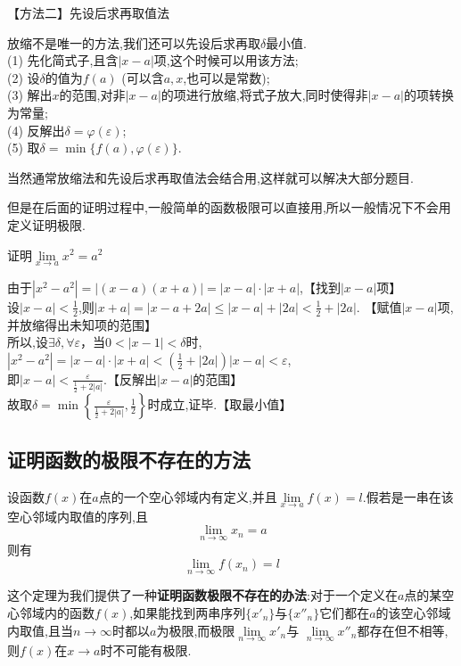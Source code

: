 \noindent 【方法二】先设后求再取值法\vspace{0.8em}
\par 放缩不是唯一的方法,我们还可以先设后求再取$\delta $最小值.\\[0.3em]
\noindent (1) 先化简式子,且含$|x-a|$项,这个时候可以用该方法;\\[0.5em]
\noindent (2) 设$\delta $的值为$f(a)$ (可以含$a,x$,也可以是常数);\\[0.5em]
\noindent (3) 解出$x$的范围,对非$|x - a|$的项进行放缩,将式子放大,同时使得非$|x - a|$的项转换为常量;\\[0.5em]
\noindent (4) 反解出$\delta = \varphi (\varepsilon)$;\\[0.5em]
\noindent (5) 取$\delta = \min \lbrace f(a),\varphi(\varepsilon)\rbrace$.\vspace{0.5em}
\par 当然通常放缩法和先设后求再取值法会结合用,这样就可以解决大部分题目.
\par 但是在后面的证明过程中,一般简单的函数极限可以直接用,所以一般情况下不会用定义证明极限.

\examples 证明$\lim\limits_{x \to a}x^2=a^2$

\proof 由于$|x^2-a^2|=|(x-a)(x+a)|=|x-a|\cdot |x+a| $,\hspace{16em}【找到$|x-a|$项】\\[0.5em]
设$\displaystyle |x-a|<\frac{1}{2}$,则$\displaystyle |x+a|=|x-a+2a|\le |x-a|+|2a|<\frac{1}{2}+|2a|.$ \hspace*{2em}【赋值$|x-a|$项,并放缩得出未知项的范围】\\[0.5em]
所以,设$\exists \delta,\forall \varepsilon$，当$0<|x-1|<\delta $时,$\displaystyle |x^2-a^2|=|x-a|\cdot |x+a|<\left( \frac{1}{2}+|2a|\right)|x-a|<\varepsilon $,\\[0.5em]
即$\displaystyle|x-a|<\frac{\varepsilon}{\frac{1}{2}+2|a|}$.\hspace{29em}【反解出$|x-a|$的范围】\\[0.5em]
故取$\displaystyle \delta = \min \left\lbrace  \frac{\varepsilon}{\frac{1}{2}+2|a|},\frac{1}{2} \right\rbrace $时成立,证毕.\hspace{26em}【取最小值】

\subsection{证明函数的极限不存在的方法}
\ttheorem[序列极限]
设函数$f (x)$在$a$点的一个空心邻域内有定义,并且$\lim\limits_{x \to a}f(x)=l$.假若是一串在该空心邻域内取值的序列,且
\begin{equation*}
\lim\limits_{n \to \infty}x_n=a
\end{equation*}
则有
\begin{equation}
\lim\limits_{n \to \infty}f(x_n)=l
\end{equation}
\par 这个定理为我们提供了一种\textbf{证明函数极限不存在的办法}:对于一个定义在$a$点的某空心邻域内的函数$f(x)$,如果能找到两串序列$\lbrace x'_n \rbrace $与$\lbrace x''_n\rbrace$它们都在$a$的该空心邻域内取值,且当$n\to \infty $时都以$a$为极限,而极限$\lim\limits_{n \to \infty }x'_n$与 $\lim\limits_{n \to \infty }x''_n$都存在但不相等,则$f(x)$在$x \to a$时不可能有极限.\jg

